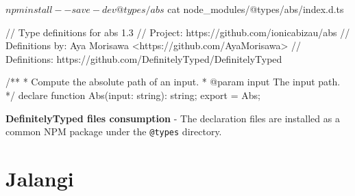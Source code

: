 \begin{code}
	\begin{bashinline}
$ npm install --save-dev @types/abs 
$ cat node_modules/@types/abs/index.d.ts

// Type definitions for abs 1.3
// Project: https://github.com/ionicabizau/abs
// Definitions by: Aya Morisawa <https://github.com/AyaMorisawa>
// Definitions: https://github.com/DefinitelyTyped/DefinitelyTyped

/**
 * Compute the absolute path of an input.
 * @param input The input path.
 */
declare function Abs(input: string): string;
export = Abs;
	  \end{bashinline}
	\caption[DefinitelyTyped files consumption]{\textbf{DefinitelyTyped files consumption} - The declaration files are installed as a common NPM package under the \texttt{@types} directory.}
	\label{code:background-definitely-typed-consumption}
  \end{code}

\section{Jalangi} \label{sec:jalangi}
